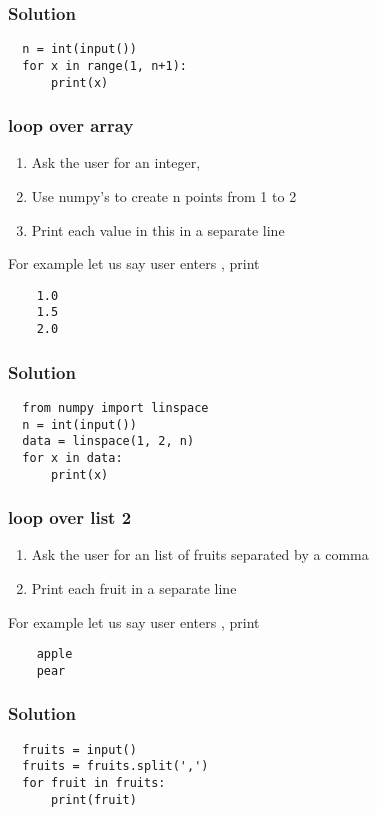 \documentclass[14pt,compress]{beamer}
\begin{document}
\begin{frame}
\frametitle{Solution}
\begin{lstlisting}
  n = int(input())
  for x in range(1, n+1):
      print(x)
\end{lstlisting}
\end{frame}


\begin{frame}
  \frametitle{ loop over array}
  \begin{enumerate}
  \item Ask the user for an integer, 
  \item Use numpy's  to create n points from 1 to 2
  \item Print each value in this in a separate line
  \end{enumerate}
  For example let us say user enters , print
  \begin{lstlisting}
    1.0
    1.5
    2.0
  \end{lstlisting}
\end{frame}

\begin{frame}
\frametitle{Solution}
\begin{lstlisting}
  from numpy import linspace
  n = int(input())
  data = linspace(1, 2, n)
  for x in data:
      print(x)
\end{lstlisting}
\end{frame}


\begin{frame}
  \frametitle{ loop over list 2}
  \begin{enumerate}
  \item Ask the user for an list of fruits separated by a comma
  \item Print each fruit in a separate line
  \end{enumerate}
  For example let us say user enters , print
  \begin{lstlisting}
    apple
    pear
  \end{lstlisting}
\end{frame}

\begin{frame}
\frametitle{Solution}
\begin{lstlisting}
  fruits = input()
  fruits = fruits.split(',')
  for fruit in fruits:
      print(fruit)
\end{lstlisting}
\end{frame}
\end{document}
